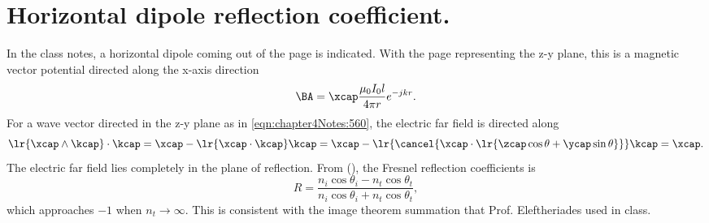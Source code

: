 \section{Horizontal dipole reflection coefficient.}
%
In the class notes, a horizontal dipole coming out of the page is indicated.  With the page representing the z-y plane, this is a magnetic vector potential directed along the x-axis direction
%
\begin{equation}\label{eqn:chapter4Notes:640}
\BA = \xcap \frac{\mu_0 I_0 l}{4 \pi r} e^{-j k r}.
\end{equation}
%
For a wave vector directed in the z-y plane as in \cref{eqn:chapter4Notes:560}, the electric far field is directed along
%
\begin{dmath}\label{eqn:chapter4Notes:660}
\lr{ \xcap \wedge \kcap } \cdot \kcap
=
\xcap - \lr{ \xcap \cdot \kcap } \kcap
=
\xcap - \lr{ \cancel{\xcap \cdot \lr{
\zcap \cos\theta + \ycap \sin\theta
}} } \kcap
= \xcap.
\end{dmath}
%
The electric far field lies completely in the plane of reflection.  From \citep{hecht1998hecht} (), the Fresnel reflection coefficients is
%
\begin{dmath}\label{eqn:chapter4Notes:680}
R =
\frac{
n_i \cos\theta_i - n_t \cos\theta_t
}
{
n_i \cos\theta_i + n_t \cos\theta_t
},
\end{dmath}
%
which approaches \( -1 \) when \( n_t \rightarrow \infty \).  This is consistent with the image theorem summation that Prof. Eleftheriades used in class.
%

